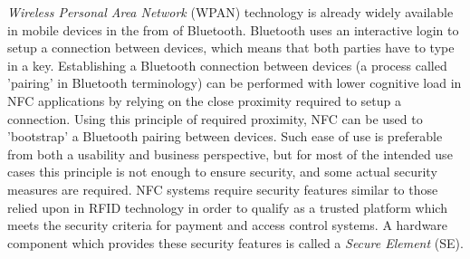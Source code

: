 \textit{Wireless Personal Area Network} (WPAN) technology is already widely available in mobile devices in the from of Bluetooth.
Bluetooth uses an interactive login to setup a connection between devices, which means that both parties have to type in a key.
Establishing a Bluetooth connection between devices (a process called 'pairing' in Bluetooth terminology) can be performed with lower cognitive load in NFC applications by relying on the close proximity required to setup a connection.
Using this principle of required proximity, NFC can be used to 'bootstrap' a Bluetooth pairing between devices.
Such ease of use is preferable from both a usability and business perspective, but for most of the intended use cases this principle is not enough to ensure security, and some actual security measures are required.
NFC systems require security features similar to those relied upon in RFID technology in order to qualify as a trusted platform which meets the security criteria for payment and access control systems.
A hardware component which provides these security features is called a \textit{Secure Element} (SE).





